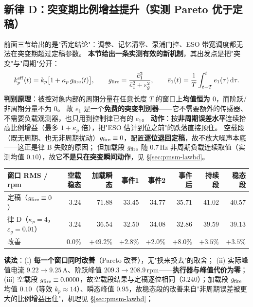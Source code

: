 \documentclass[11pt]{article}
\theoremstyle{remark}\newtheorem{remark}{注}
\begin{document}
\subsection{新律 D：突变期比例增益提升（实测 Pareto 优于定稿）}\label{sec:pmsm-lawd}
前面三节给出的是"否定结论"：调参、记忆清零、泵浦门控、ESO 带宽调度都无法在突变期超过定稿参数。
\textbf{本节给出一条实测有效的新机制}，其出发点是把"突变"与"周期"分开：
\begin{equation}
k_p^{\rm eff}(t)=k_p\bigl[1+\kappa_p\,g_{\rm fire}(t)\bigr],\qquad
g_{\rm fire}=\frac{\bar e_1^2}{\bar e_1^2+\varepsilon_g^2},\qquad
\bar e_1(t)=\frac1T\int_{t-T}^{t}e_1(\tau)\,\mathrm d\tau .
\label{eq:pmsm-lawd}
\end{equation}
\textbf{判别原理}：被控对象内部的周期分量在任意长度 $T$ 的窗口上\textbf{均值恒为 $0$}，而阶跃/非周期分量不为 $0$。
故 $\bar e_1$ 是一个\textbf{免费的突变判别器}——它不需要额外的传感器、不需要负载观测器，也只用到控制律已有的 $e_1$。
\textbf{动作}：按\textbf{非周期误差水平}连续抬高比例增益（最多 $1+\kappa_p$ 倍），把"ESO 估计到位之前"的跌落直接顶住。
空载段（既无周期、也无非周期扰动）$g_{\rm fire}\equiv0$，配置\textbf{逐位退回定稿}，故不放大噪声本底——这正是律 B 失败的原因；
但加载段 $g_{\rm fire}$ 随 $0.7$\,Hz 非周期负载连续取值（实测均值 $0.10$），故它\textbf{不是只在突变瞬间动作}，见 §\ref{sec:pmsm-lawbd}。
\begin{center}
\footnotesize
\begin{tabular}{@{}lrrrrrrr@{}}
\toprule
窗口 RMS / rpm & 空载稳态 & 加载瞬态 & 事件1 & 事件2 & 事件后 & 持续段 & 稳态段\\
\midrule
定稿（$g_{\rm fire}\equiv0$） & $3.24$ & $71.88$ & $33.45$ & $34.77$ & $35.71$ & $41.02$ & $40.57$\\
律 D（$\kappa_p=4$，$\varepsilon_g=0.01$） & $3.24$ & $\mathbf{36.54}$ & $32.50$ & $34.08$ & $32.86$ & $39.59$ & $39.13$\\
改善 & $0.0\%$ & $\mathbf{+49.2\%}$ & $+2.8\%$ & $+2.0\%$ & $+8.0\%$ & $+3.5\%$ & $+3.5\%$\\
\bottomrule
\end{tabular}
\end{center}
\noindent\textbf{读法}：(i) \textbf{每一个窗口同时改善}（Pareto 改善），无"换来换去"的取舍；
(ii) 实际峰值电流 $9.22\to9.25$\,A、阶跃峰值 $209.3\to208.9$\,rpm——\textbf{执行器与峰值代价为零}；
(iii) 空载段 $g_{\rm fire}\equiv0.0000$，故空载段结果与定稿逐位相同（$3.240$）；加载段 $g_{\rm fire}$ 均值 $0.10$（等效 $k_p\approx14$）、瞬态峰值 $0.95$，故稳态段的改善来自"非周期误差被更大的比例增益压住"，机理见 §\ref{sec:pmsm-lawbd}；
\end{document}
